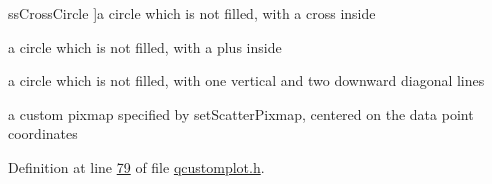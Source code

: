 \begin{Desc}
\begin{description}
{\hypertarget{a00143_af66d0711d42fe78d96c28abadc67f26fa32c6bc5b7596ba0cca2342ef6e846fbe}{ss\+Cross\+Circle}\label{a00143_af66d0711d42fe78d96c28abadc67f26fa32c6bc5b7596ba0cca2342ef6e846fbe}
}]a circle which is not filled, with a cross inside \item[{\em 
\hypertarget{a00143_af66d0711d42fe78d96c28abadc67f26fa78f2658826f26f4d266962845a1bb827}{ss\+Plus\+Circle}\label{a00143_af66d0711d42fe78d96c28abadc67f26fa78f2658826f26f4d266962845a1bb827}
}]a circle which is not filled, with a plus inside \item[{\em 
\hypertarget{a00143_af66d0711d42fe78d96c28abadc67f26fae2ed4e86e8d0676b7c1476a1e8692070}{ss\+Peace}\label{a00143_af66d0711d42fe78d96c28abadc67f26fae2ed4e86e8d0676b7c1476a1e8692070}
}]a circle which is not filled, with one vertical and two downward diagonal lines \item[{\em 
\hypertarget{a00143_af66d0711d42fe78d96c28abadc67f26fa3046d385199d0903dd492322ba133e75}{ss\+Pixmap}\label{a00143_af66d0711d42fe78d96c28abadc67f26fa3046d385199d0903dd492322ba133e75}
}]a custom pixmap specified by set\+Scatter\+Pixmap, centered on the data point coordinates \end{description}
\end{Desc}


Definition at line \hyperlink{a00116_source_l00079}{79} of file \hyperlink{a00116_source}{qcustomplot.\+h}.


